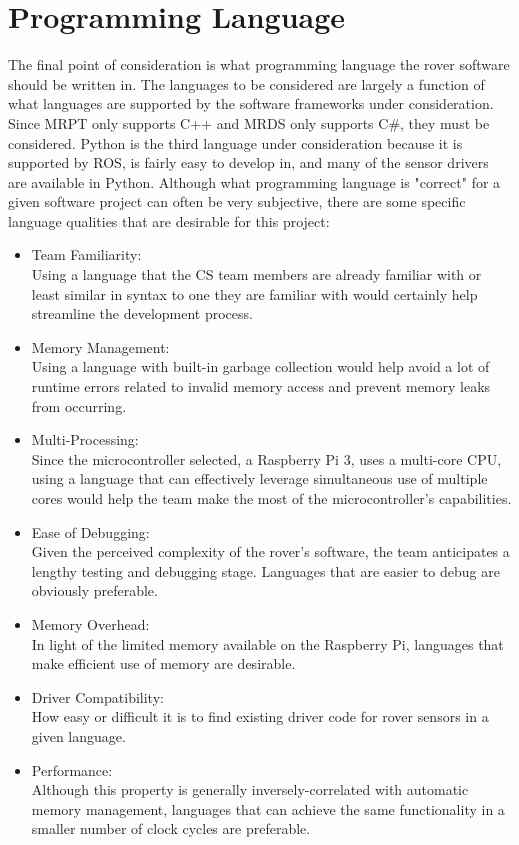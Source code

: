 \documentclass[onecolumn, draftclsnofoot,10pt, compsoc]{IEEEtran}
\begin{document}
\section{Programming Language}
The final point of consideration is what programming language the rover software should be written in. The languages to be considered are largely a function of what languages are supported by the software frameworks under consideration. Since MRPT only supports C++ and MRDS only supports C\#, they must be considered. Python is the third language under consideration because it is supported by ROS, is fairly easy to develop in, and many of the sensor drivers are available in Python. Although what programming language is "correct" for a given software project can often be very subjective, there are some specific language qualities that are desirable for this project:
\begin{itemize}
\item Team Familiarity:\\Using a language that the CS team members are already
familiar with or least similar in syntax to one they are familiar with would
certainly help streamline the development process.
\item Memory Management:\\Using a language with built-in garbage collection
would help avoid a lot of runtime errors related to invalid memory access
and prevent memory leaks from occurring.
\item Multi-Processing:\\Since the microcontroller selected, a Raspberry Pi 3, uses
a multi-core CPU, using a language that can effectively leverage simultaneous use of
multiple cores would help the team make the most of the microcontroller's
capabilities.
\item Ease of Debugging:\\Given the perceived complexity of the rover's software,
the team anticipates a lengthy testing and debugging stage. Languages that
are easier to debug are obviously preferable.
\item Memory Overhead:\\In light of the limited memory available on the
Raspberry Pi, languages that make efficient use of memory are desirable.
\item Driver Compatibility:\\How easy or difficult it is to find existing driver code for rover sensors in a given language.
\item Performance:\\Although this property is generally inversely-correlated with
automatic memory management, languages that can achieve the same
functionality in a smaller number of clock cycles are preferable.
\end{itemize}
\end{document}
